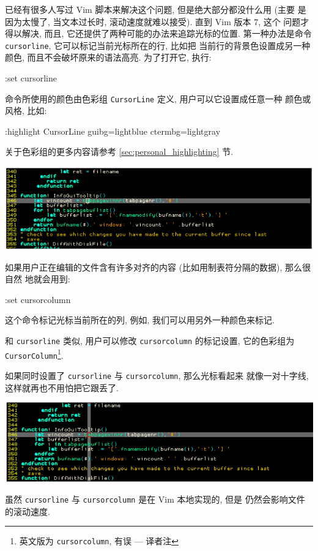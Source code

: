 已经有很多人写过 Vim 脚本来解决这个问题, 但是绝大部分都没什么用 (主要 
是因为太慢了, 当文本过长时, 滚动速度就难以接受). 直到 Vim 版本 7, 这个 
问题才得以解决, 而且, 它还提供了两种可能的办法来追踪光标的位置.
第一种办法是命令 \texttt{cursorline}, 它可以标记当前光标所在的行, 比如把
当前行的背景色设置成另一种颜色, 而且不会破坏原来的语法高亮. 为了打开它,
执行:
\begin{vimcmd}
:set cursorline
\end{vimcmd}
命令所使用的颜色由色彩组 \texttt{CursorLine} 定义, 用户可以它设置成任意一种
颜色或风格, 比如:
\begin{vimcmd}
:highlight CursorLine guibg=lightblue ctermbg=lightgray
\end{vimcmd}
关于色彩组的更多内容请参考 \ref{sec:personal_highlighting} 节.

\begin{center}
    \includegraphics[scale=0.5]{./images/page38-1.png}
\end{center}

如果用户正在编辑的文件含有许多对齐的内容 (比如用制表符分隔的数据), 那么很自然
地就会用到:
\begin{vimcmd}
:set cursorcolumn
\end{vimcmd}

这个命令标记光标当前所在的列, 例如, 我们可以用另外一种颜色来标记.

和 \texttt{cursorline} 类似, 用户可以修改 \texttt{cursorcolumn} 的标记设置,
它的色彩组为 \texttt{CursorColumn}\footnote{英文版为
\texttt{cursorcolumn}, 有误 --- 译者注}.

如果同时设置了 \texttt{cursorline} 与 \texttt{cursorcolumn}, 那么光标看起来
就像一对十字线, 这样就再也不用怕把它跟丢了.
\begin{center}
    \includegraphics[scale=0.45]{./images/page38-2.png}
\end{center}
\begin{warning}
虽然 \texttt{cursorline} 与 \texttt{cursorcolumn} 是在 Vim 本地实现的, 但是 
仍然会影响文件的滚动速度.
\end{warning}


